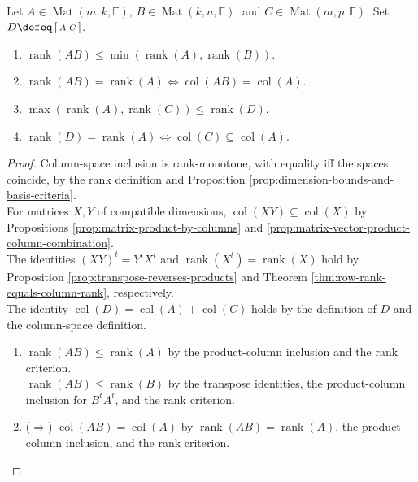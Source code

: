 \begin{theorem} \label{thm:rank-product-and-concatenation-bounds} \\
Let $A\in\operatorname{Mat}(m,k,\mathbb{F})$, $B\in\operatorname{Mat}(k,n,\mathbb{F})$, and $C\in\operatorname{Mat}(m,p,\mathbb{F})$. Set $D\defeq\left[\begin{smallmatrix}A&C\end{smallmatrix}\right]$.
\begin{enumerate}[label=(\roman*)]
\setlength{\itemsep}{0pt}
\item $\operatorname{rank}(AB)\leq\min(\operatorname{rank}(A),\operatorname{rank}(B))$.
\item $\operatorname{rank}(AB)=\operatorname{rank}(A)\Longleftrightarrow\operatorname{col}(AB)=\operatorname{col}(A)$.
\item $\max(\operatorname{rank}(A),\operatorname{rank}(C))\leq\operatorname{rank}(D)$.
\item $\operatorname{rank}(D)=\operatorname{rank}(A)\Longleftrightarrow\operatorname{col}(C)\subseteq\operatorname{col}(A)$.
\end{enumerate}
\begin{proof}
Column-space inclusion is rank-monotone, with equality iff the spaces coincide, by the rank definition and Proposition \ref{prop:dimension-bounds-and-basis-criteria}.\\
For matrices $X,Y$ of compatible dimensions, $\operatorname{col}(XY)\subseteq\operatorname{col}(X)$ by Propositions \ref{prop:matrix-product-by-columns} and \ref{prop:matrix-vector-product-column-combination}.\\
The identities $(XY)^t=Y^tX^t$ and $\operatorname{rank}(X^t)=\operatorname{rank}(X)$ hold by Proposition \ref{prop:transpose-reverses-products} and Theorem \ref{thm:row-rank-equals-column-rank}, respectively.\\
The identity $\operatorname{col}(D)=\operatorname{col}(A)+\operatorname{col}(C)$ holds by the definition of $D$ and the column-space definition.
\begin{enumerate}[label=(\roman*)]
\setlength{\itemsep}{0pt}
\item[$(i)$] $\operatorname{rank}(AB)\leq\operatorname{rank}(A)$ by the product-column inclusion and the rank criterion.\\
$\operatorname{rank}(AB)\leq\operatorname{rank}(B)$ by the transpose identities, the product-column inclusion for $B^tA^t$, and the rank criterion.
\item[$(ii)$] ($\Rightarrow$) $\operatorname{col}(AB)=\operatorname{col}(A)$ by $\operatorname{rank}(AB)=\operatorname{rank}(A)$, the product-column inclusion, and the rank criterion.

\end{enumerate}
\end{proof}
\end{theorem}
